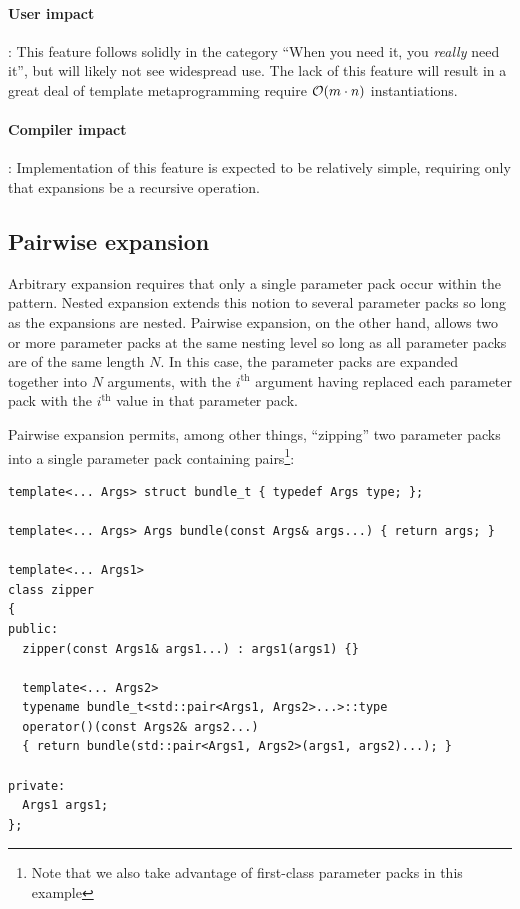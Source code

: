 \documentclass{article}
\begin{document}
\paragraph{User impact}: This feature follows solidly in the category
``When you need it, you \textit{really} need it'', but will likely not
see widespread use. The lack of this feature will result in a great deal
of template metaprogramming require ${\cal O}(m \cdot n)$ instantiations.

\paragraph{Compiler impact}: Implementation of this feature is
expected to be relatively simple, requiring only that expansions be a
recursive operation.

\subsection{Pairwise expansion}
Arbitrary expansion requires that only a single parameter pack occur
within the pattern. Nested expansion extends this notion to several
parameter packs so long as the expansions are nested. Pairwise
expansion, on the other hand, allows two or more parameter packs at
the same nesting level so long as all parameter packs are of the same
length $N$. In this case, the parameter packs are expanded together
into $N$ arguments, with the $i^{\text{th}}$ argument having replaced
each parameter pack with the $i^{\text{th}}$ value in that parameter
pack.

Pairwise expansion permits, among other things, ``zipping'' two
parameter packs into a single parameter pack containing
pairs\footnote{Note that we also take advantage of first-class
  parameter packs in this example}:

\begin{verbatim}
template<... Args> struct bundle_t { typedef Args type; };

template<... Args> Args bundle(const Args& args...) { return args; }

template<... Args1>
class zipper
{
public:
  zipper(const Args1& args1...) : args1(args1) {}

  template<... Args2>
  typename bundle_t<std::pair<Args1, Args2>...>::type
  operator()(const Args2& args2...)
  { return bundle(std::pair<Args1, Args2>(args1, args2)...); }

private:
  Args1 args1;
};
\end{verbatim}
\end{document}
